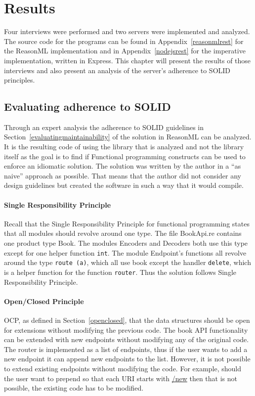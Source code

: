 \chapter{Results}\label{results}

Four interviews were performed and two servers were implemented and analyzed.
The source code for the programs can be found in Appendix~\ref{reasonmlrest} for
the ReasonML implementation and in Appendix~\ref{nodejsrest} for the imperative
implementation, written in Express.  This chapter will present the results of
those interviews and also present an analysis of the server's adherence to SOLID
principles.

\section{Evaluating adherence to SOLID}

Through an expert analysis the adherence to SOLID guidelines in
Section~\ref{evaluatingmaintainability} of the solution in ReasonML can be
analyzed. It is the resulting code of using the library that is analyzed and
not the library itself as the goal is to find if Functional programming
constructs can be used to enforce an idiomatic solution.  The solution was
written by the author in a ``as naive'' approach as possible.  That means that
the author did not consider any design guidelines but created the software in
such a way that it would compile.

\subsubsection{Single Responsibility Principle}

Recall that the Single Responsibility Principle for functional programming
states that all modules should revolve around one type.  The file BookApi.re
contains one product type Book. The modules Encoders and Decoders both use this
type except for one helper function \texttt{int}.  The module Endpoint's
functions all revolve around the type \texttt{route (a)}, which all use book
except the handler \texttt{delete}, which is a helper function for the function
\texttt{router}. Thus the solution follows Single Responsibility Principle.

\subsubsection{Open/Closed Principle}

OCP, as defined in Section~\ref{openclosed}, that the data structures should be
open for extensions without modifying the previous code.  The book API
functionality can be extended with new endpoints without modifying any of the
original code. The router is implemented as a list of endpoints, thus if the
user wants to add a new endpoint it can append new endpoints to the list.
However, it is not possible to extend existing endpoints without modifying the
code.  For example, should the user want to prepend so that each URI starts with
\url{/new} then that is not possible, the existing code has to be modified.

